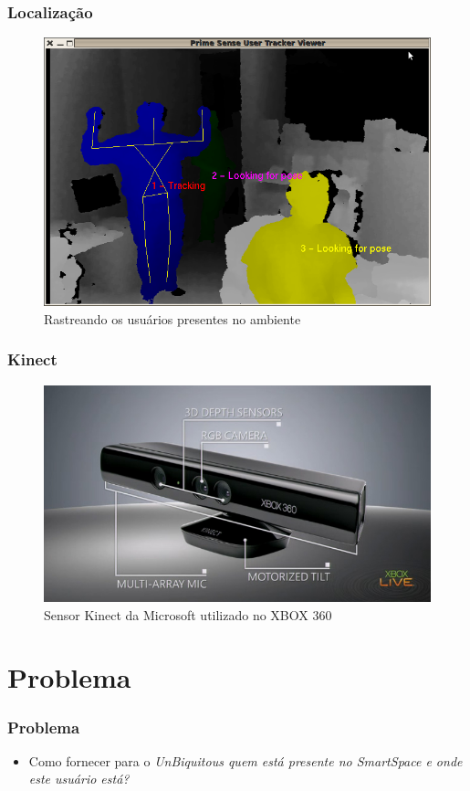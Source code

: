 \documentclass{beamer}
\begin{document}
\begin{frame}
    \frametitle{Localização}
    \begin{figure}[h]
    \centering \includegraphics[scale=0.3]{figuras/sampleOpenNI.png}
        \caption{Rastreando os usuários presentes no ambiente}
        \label{sampleOpenNI}
    \end{figure}   
\end{frame}


\begin{frame}
    \frametitle{Kinect}
    
    \begin{figure}[h]
    \centering \includegraphics[scale=0.4]{figuras/kinect_info.jpg}
        \caption{Sensor Kinect da Microsoft utilizado no XBOX 360}
        \label{reconhecimento_facial}
    \end{figure}
\end{frame}

\section{Problema}
\begin{frame}
    \frametitle{Problema}
    \begin{itemize}
      \item Como fornecer para o \it{UnBiquitous} quem está presente no \it{SmartSpace} e onde este usuário está?
    \end{itemize}
\end{frame}
\end{document}
